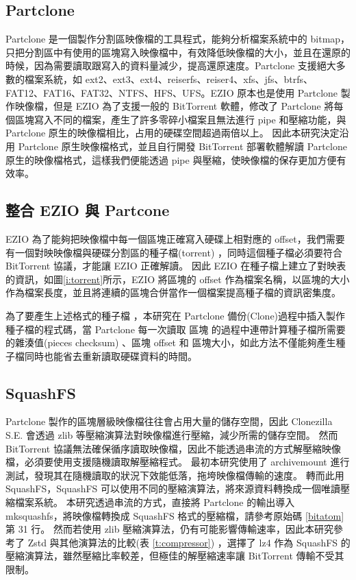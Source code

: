 \subsection{Partclone}
Partclone 是一個製作分割區映像檔的工具程式，能夠分析檔案系統中的 bitmap，只把分割區中有使用的區塊寫入映像檔中，有效降低映像檔的大小，並且在還原的時候，因為需要讀取跟寫入的資料量減少，提高還原速度。Partclone 支援絕大多數的檔案系統，如 ext2、ext3、ext4、reiserfs、reiser4、xfs、jfs、btrfs、FAT12、FAT16、FAT32、NTFS、HFS、UFS。EZIO 原本也是使用 Partclone 製作映像檔，但是 EZIO 為了支援一般的 BitTorrent 軟體，修改了 Partclone 將每個區塊寫入不同的檔案，產生了許多零碎小檔案且無法進行 pipe 和壓縮功能，與 Partclone 原生的映像檔相比，占用的硬碟空間超過兩倍以上。
因此本研究決定沿用 Partclone 原生映像檔格式，並且自行開發 BitTorrent 部署軟體解讀 Partclone 原生的映像檔格式，這樣我們便能透過 pipe 與壓縮，使映像檔的保存更加方便有效率。


\subsection{整合 EZIO 與 Partcone} \label{ezio_and_partclone}

EZIO 為了能夠把映像檔中每一個區塊正確寫入硬碟上相對應的 offset，我們需要有一個對映映像檔與硬碟分割區的種子檔(torrent) ，同時這個種子檔必須要符合 BitTorrent 協議，才能讓 EZIO 正確解讀。
因此 EZIO 在種子檔上建立了對映表的資訊，如圖\ref{i:torrent}所示，EZIO 將區塊的 offset 作為檔案名稱，以區塊的大小作為檔案長度，並且將連續的區塊合併當作一個檔案提高種子檔的資訊密集度。


為了要產生上述格式的種子檔 ，本研究在 Partclone 備份(Clone)過程中插入製作種子檔的程式碼，當 Partclone 每一次讀取 區塊 的過程中連帶計算種子檔所需要的雜湊值(pieces checksum) 、區塊 offset 和 區塊大小，如此方法不僅能夠產生種子檔同時也能省去重新讀取硬碟資料的時間。


\subsection{SquashFS}
Partclone 製作的區塊層級映像檔往往會占用大量的儲存空間，因此 Clonezilla S.E. 會透過 zlib 等壓縮演算法對映像檔進行壓縮，減少所需的儲存空間。
然而 BitTorrent 協議無法確保循序讀取映像檔，因此不能透過串流的方式解壓縮映像檔，必須要使用支援隨機讀取解壓縮程式。
最初本研究使用了 archivemount 進行測試，發現其在隨機讀取的狀況下效能低落，拖垮映像檔傳輸的速度。
轉而此用 SquashFS，SquashFS 可以使用不同的壓縮演算法，將來源資料轉換成一個唯讀壓縮檔案系統。
本研究透過串流的方式，直接將 Partclone 的輸出導入 mksquashfs，將映像檔轉換成 SquashFS 格式的壓縮檔，請參考原始碼 \ref{bitatom}第 31 行。
然而若使用 zlib 壓縮演算法，仍有可能影響傳輸速率，因此本研究參考了 Zstd 與其他演算法的比較(表 \ref{t:compressor}) ，選擇了 lz4 作為 SquashFS 的壓縮演算法，雖然壓縮比率較差，但極佳的解壓縮速率讓 BitTorrent 傳輸不受其限制。


